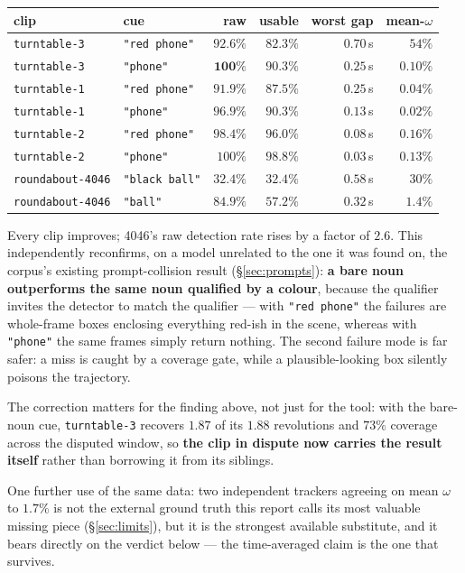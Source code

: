 \documentclass[11pt,a4paper]{article}
\begin{document}
\begin{center}\small
\begin{tabular}{@{}llrrrr@{}}
\toprule
clip & cue & raw & usable & worst gap & mean-$\omega$ \\
\midrule
\texttt{turntable-3} & \texttt{"red phone"} & $92.6\%$ & $82.3\%$ & $0.70$\,s & $54\%$ \\
\texttt{turntable-3} & \texttt{"phone"} & $\mathbf{100\%}$ & $\mathbf{90.3\%}$ & $\mathbf{0.25}$\,s & $\mathbf{0.10\%}$ \\
\texttt{turntable-1} & \texttt{"red phone"} & $91.9\%$ & $87.5\%$ & $0.25$\,s & $0.04\%$ \\
\texttt{turntable-1} & \texttt{"phone"} & $96.9\%$ & $90.3\%$ & $0.13$\,s & $0.02\%$ \\
\texttt{turntable-2} & \texttt{"red phone"} & $98.4\%$ & $96.0\%$ & $0.08$\,s & $0.16\%$ \\
\texttt{turntable-2} & \texttt{"phone"} & $100\%$ & $98.8\%$ & $0.03$\,s & $0.13\%$ \\
\texttt{roundabout-4046} & \texttt{"black ball"} & $32.4\%$ & $32.4\%$ & $0.58$\,s & $30\%$ \\
\texttt{roundabout-4046} & \texttt{"ball"} & $\mathbf{84.9\%}$ & $\mathbf{57.2\%}$ & $0.32$\,s & $\mathbf{1.4\%}$ \\
\bottomrule
\end{tabular}
\end{center}

\noindent Every clip improves; 4046's raw detection rate rises by a factor of $2.6$. This
independently reconfirms, on a model unrelated to the one it was found on, the corpus's existing
prompt-collision result (\S\ref{sec:prompts}): \textbf{a bare noun outperforms the same noun
qualified by a colour}, because the qualifier invites the detector to match the qualifier --- with
\texttt{"red phone"} the failures are whole-frame boxes enclosing everything red-ish in the scene,
whereas with \texttt{"phone"} the same frames simply return nothing. The second failure mode is far
safer: a miss is caught by a coverage gate, while a plausible-looking box silently poisons the
trajectory.

The correction matters for the finding above, not just for the tool: with the bare-noun cue,
\texttt{turntable-3} recovers $1.87$ of its $1.88$ revolutions and $73\%$ coverage across the
disputed window, so \textbf{the clip in dispute now carries the result itself} rather than borrowing
it from its siblings.

One further use of the same data: two independent trackers agreeing on mean $\omega$ to $1.7\%$ is
not the external ground truth this report calls its most valuable missing piece
(\S\ref{sec:limits}), but it is the strongest available substitute, and it bears directly on the
verdict below --- the time-averaged claim is the one that survives.
\end{document}
